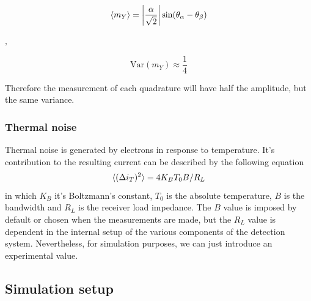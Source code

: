 \begin{bibunit}[plain]
%
%
\begin{center}
	\begin{minipage}{58mm}
		\noindent
		\begin{equation}
			\braket{m_Y} =  \left|\frac{\alpha}{\sqrt{2}}\right| \sin({\theta_\alpha - \theta_\beta})
		\end{equation}
	\end{minipage}
	$,\quad$
	\begin{minipage}{37mm}
		\noindent
		\begin{equation}
			\textrm{Var}(m_Y) \approx \frac{1}{4}
		\end{equation}
	\end{minipage}
\end{center}
%
Therefore the measurement of each quadrature will have half the amplitude, but the same variance.
%
%
%
\subsubsection{Thermal noise}
Thermal noise is generated by electrons in response to temperature. It's contribution to the resulting current can be described by the following equation
\cite{fox2006}
%
\begin{equation}
\braket{(\Delta i_T)^2} = 4 K_B T_0 B/R_L
\end{equation}
%
in which $K_B$ it's Boltzmann's constant, $T_0$ is the absolute temperature, $B$ is the bandwidth and $R_L$ is the receiver load impedance. The $B$ value is imposed by default or chosen when the measurements are made, but the $R_L$ value is dependent in the internal setup of the various components of the detection system. Nevertheless, for simulation purposes, we can just introduce an experimental value.\\
\vspace{1cm}
%
%
\subsection{Simulation setup}


\end{bibunit}
